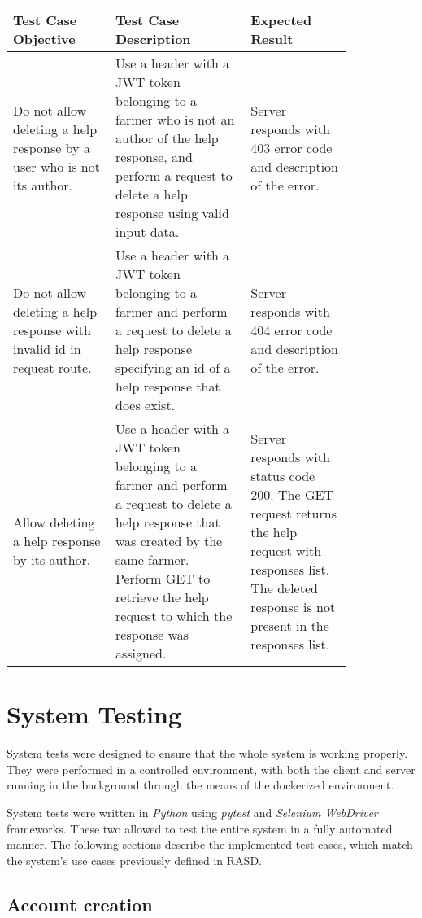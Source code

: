 \begin{longtable}{p{0.25\linewidth}p{0.33\linewidth}p{0.25\linewidth}}
	\toprule
	\textbf{Test Case Objective} & \textbf{Test Case Description} & \textbf{Expected Result}\\
	\midrule
	Do not allow deleting a help response by a user who is not its author. & Use a header with a JWT token belonging to a farmer who is not an author of the help response, and perform a request to delete a help response using valid input data. & Server responds with 403 error code and description of the error.\\	
	\midrule
	Do not allow deleting a help response with invalid id in request route. & Use a header with a JWT token belonging to a farmer and perform a request to delete a help response specifying an id of a help response that does exist. &  Server responds with 404 error code and description of the error.\\
	\midrule
	Allow deleting a help response by its author. & Use a header with a JWT token belonging to a farmer and perform a request to delete a help response that was created by the same farmer. Perform GET to retrieve the help request to which the response was assigned. & Server responds with status code 200. The GET request returns the help request with responses list. The deleted response is not present in the responses list.\\
	\bottomrule
\end{longtable}

\section{System Testing} \label{sec:system_testing}

System tests were designed to ensure that the whole system is working properly. They were performed in a controlled environment, with both the client and server running in the background through the means of the dockerized environment.

System tests were written in \textit{Python} using \textit{pytest} and \textit{Selenium WebDriver} frameworks. These two allowed to test the entire system in a fully automated manner. The following sections describe the implemented test cases, which match the system's use cases previously defined in RASD.

\subsection{Account creation}

